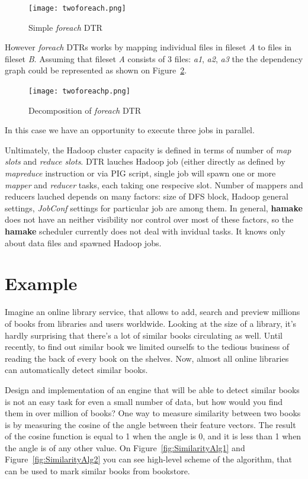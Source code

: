 \documentclass{article}
\begin{document}
\begin{figure}[htp]
\centering
\texttt{[image: twoforeach.png]}
\caption{Simple \emph{foreach} DTR}
\label{fig:foreach1}
\end{figure}

However \emph{foreach} DTRs works by mapping individual files in
fileset \textit{A} to files in fileset \textit{B}. Assuming that
fileset \textit{A} consists of 3 files: \textit{a1}, \textit{a2},
\textit{a3} the the dependency graph could be represented as shown on
Figure~\ref{fig:foreach2}.

\begin{figure}[htp]
\centering
\texttt{[image: twoforeachp.png]}
\caption{Decomposition of \emph{foreach} DTR}
\label{fig:foreach2}
\end{figure}

In this case we have an opportunity to execute three jobs in parallel.

Unltimately, the Hadoop cluster capacity is defined in terms of number
of \textit{map slots} and \textit{reduce slots}.  DTR lauches Hadoop
job (either directly as defined by \emph{mapreduce} instruction or via
PIG script, single job will spawn one or more \emph{mapper} and
\emph{reducer} tasks, each taking one respecive slot. Number of
mappers and reducers lauched depends on many factors: size of DFS
block, Hadoop general settings, \emph{JobConf} settings for particular
job are among them. In general, \textbf{hamake} does not have an neither
visibility nor control over most of these factors, so the \textbf{hamake}
scheduler currently does not deal with invidual tasks. It knows only
about data files and spawned Hadoop jobs.

\section{Example}

Imagine an online library service, that allows to add, search and preview millions
of books from libraries and users worldwide. Looking at the size of a library, it's hardly 
surprising that there's a lot of similar books circulating as well. Until recently, to find
out similar book we limited ourselfs to the tedious business of reading the back 
of every book on the shelves. Now, almost all online libraries can automatically detect similar books. 

Design and implementation of an engine that will be able to detect similar books is not an 
easy task for even a small number of data, but how would you find them in over million of books?
One way to measure similarity between two books is by measuring the cosine of the angle between their feature vectors\cite{wiki:cosinesimilarity}.
The result of the cosine function is equal to 1 when the angle is 0, and it is less than 1 when the angle is 
of any other value. On Figure~\ref{fig:SimilarityAlg1} and Figure~\ref{fig:SimilarityAlg2} you can see high-level scheme of
the algorithm, that can be used to mark similar books from bookstore.
\end{document}
